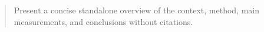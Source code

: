 \begin{abstract}
Present a concise standalone overview of the context, method, main measurements, and conclusions without citations.
\end{abstract}


